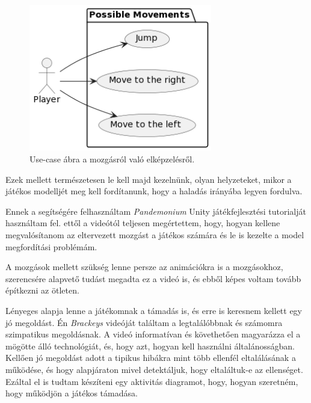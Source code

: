 \documentclass[]{thesis-ekf}
\theoremstyle{definition}
\begin{document}
	\begin{figure}[!ht]
		\label{kep:movementusecase}
		\centering
		\includegraphics[width=8cm]{movementusecase}
		\caption{Use-case ábra a mozgásról való elképzelésről.}
	\end{figure}

	Ezek mellett természetesen le kell majd kezelnünk, olyan helyzeteket, mikor a játékos modelljét meg kell fordítanunk, hogy a haladás irányába legyen fordulva.
	
	Ennek a segítségére felhasználtam \emph{Pandemonium} Unity játékfejlesztési tutorialját használtam fel.\cite{vid-unity1} ettől a videótól teljesen megértettem, hogy, hogyan kellene megvalósítanom az eltervezett mozgást a játékos számára és le is kezelte a model megfordítási problémám.
	
	A mozgások mellett szükség lenne persze az animációkra is a mozgásokhoz, szerencsére alapvető tudást megadta ez a videó is, és ebből képes voltam tovább építkezni az ötleten.
	
	Lényeges alapja lenne a játékomnak a támadás is, és erre is keresnem kellett egy jó megoldást. Én \emph{Brackeys} videóját találtam a legtalálóbbnak és számomra szimpatikus megoldásnak.\cite{vid-unity2}
	A videó informatívan és követhetően magyarázza el a mögötte álló technológiát, és, hogy azt, hogyan kell használni általánosságban.
	Kellően jó megoldást adott a tipikus hibákra mint több ellenfél eltalálásának a működése, és hogy alapjáraton mivel detektáljuk, hogy eltaláltuk-e az ellenséget. Ezáltal el is tudtam készíteni egy aktivitás diagramot, hogy, hogyan szeretném, hogy működjön a játékos támadása.
	
\end{document}
